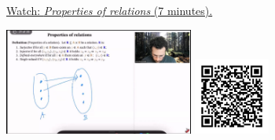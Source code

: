 
\begin{minipage}{10cm}
    \href{https://act4e-spring21.netlify.app/videos/spring2021-relations:relations:prop-rel.html}{Watch: \emph{Properties of relations} (7 minutes).}
        
    \href{https://act4e-spring21.netlify.app/videos/spring2021-relations:relations:prop-rel.html}{\includegraphics[height=3.5cm]{spring2021-relations:relations:prop-rel/thumbnails.jpg}}
    \href{https://act4e-spring21.netlify.app/videos/spring2021-relations:relations:prop-rel.html}{\includegraphics[height=2.5cm]{spring2021-relations:relations:prop-rel/qrcode.png}}
\end{minipage}
